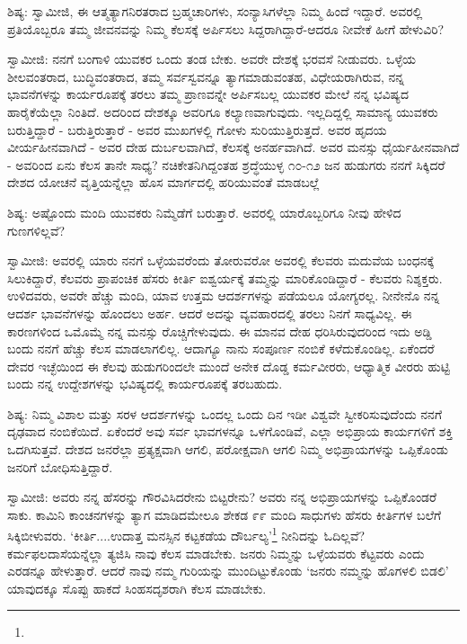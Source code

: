 ಶಿಷ್ಯ: ಸ್ವಾಮೀಜಿ, ಈ ಆತ್ಮತ್ಯಾಗನಿರತರಾದ ಬ್ರಹ್ಮಚಾರಿಗಳು, ಸಂನ್ಯಾಸಿಗಳೆಲ್ಲಾ ನಿಮ್ಮ ಹಿಂದೆ ಇದ್ದಾರೆ. ಅವರಲ್ಲಿ ಪ್ರತಿಯೊಬ್ಬರೂ ತಮ್ಮ ಜೀವನವನ್ನು ನಿಮ್ಮ ಕೆಲಸಕ್ಕೆ ಅರ್ಪಿಸಲು ಸಿದ್ದರಾಗಿದ್ದಾರೆ-ಆದರೂ ನೀವೇಕೆ ಹೀಗೆ ಹೇಳುವಿರಿ?

ಸ್ವಾಮೀಜಿ: ನನಗೆ ಬಂಗಾಳಿ ಯುವಕರ ಒಂದು ತಂಡ ಬೇಕು. ಅವರೇ ದೇಶಕ್ಕೆ ಭರವಸೆ ನೀಡುವರು. ಒಳ್ಳೆಯ ಶೀಲವಂತರಾದ, ಬುದ್ಧಿವಂತರಾದ, ತಮ್ಮ ಸರ್ವಸ್ವವನ್ನೂ ತ್ಯಾಗಮಾಡುವಂತಹ, ವಿಧೇಯರಾಗಿರುವ, ನನ್ನ ಭಾವನೆಗಳನ್ನು ಕಾರ್ಯರೂಪಕ್ಕೆ ತರಲು ತಮ್ಮ ಪ್ರಾಣವನ್ನೇ ಅರ್ಪಿಸಬಲ್ಲ ಯುವಕರ ಮೇಲೆ ನನ್ನ ಭವಿಷ್ಯದ ಹಾರೈಕೆಯೆಲ್ಲಾ ನಿಂತಿದೆ. ಅದರಿಂದ ದೇಶಕ್ಕೂ ಅವರಿಗೂ ಕಲ್ಯಾಣವಾಗುವುದು. ಇಲ್ಲದಿದ್ದಲ್ಲಿ ಸಾಮಾನ್ಯ ಯುವಕರು ಬರುತ್ತಿದ್ದಾರೆ - ಬರುತ್ತಿರುತ್ತಾರೆ - ಅವರ ಮುಖಗಳಲ್ಲಿ ಗೋಳು ಸುರಿಯುತ್ತಿರುತ್ತದೆ. ಅವರ ಹೃದಯ ವೀರ್ಯಹೀನವಾಗಿದೆ - ಅವರ ದೇಹ ದುರ್ಬಲವಾಗಿದೆ, ಕೆಲಸಕ್ಕೆ ಅನರ್ಹವಾಗಿದೆ. ಅವರ ಮನಸ್ಸು ಧೈರ್ಯಹೀನವಾಗಿದೆ - ಅವರಿಂದ ಏನು ಕೆಲಸ ತಾನೇ ಸಾಧ್ಯ? ನಚಿಕೇತನಿಗಿದ್ದಂತಹ ಶ್ರದ್ಧೆಯುಳ್ಳ ೧೦-೧೨ ಜನ ಹುಡುಗರು ನನಗೆ ಸಿಕ್ಕಿದರೆ ದೇಶದ ಯೋಚನೆ ವೃತ್ತಿಯನ್ನೆಲ್ಲಾ ಹೊಸ ಮಾರ್ಗದಲ್ಲಿ ಹರಿಯುವಂತೆ ಮಾಡಬಲ್ಲೆ

ಶಿಷ್ಯ: ಅಷ್ಟೊಂದು ಮಂದಿ ಯುವಕರು ನಿಮ್ಮೆಡೆಗೆ ಬರುತ್ತಾರೆ. ಅವರಲ್ಲಿ ಯಾರೊಬ್ಬರಿಗೂ ನೀವು ಹೇಳಿದ ಗುಣಗಳಿಲ್ಲವೆ?

ಸ್ವಾಮೀಜಿ: ಅವರಲ್ಲಿ ಯಾರು ನನಗೆ ಒಳ್ಳೆಯವರೆಂದು ತೋರುವರೋ ಅವರಲ್ಲಿ ಕೆಲವರು ಮದುವೆಯ ಬಂಧನಕ್ಕೆ ಸಿಲುಕಿದ್ದಾರೆ, ಕೆಲವರು ಪ್ರಾಪಂಚಿಕ ಹೆಸರು ಕೀರ್ತಿ ಐಶ್ವರ್ಯಕ್ಕೆ ತಮ್ಮನ್ನು ಮಾರಿಕೊಂಡಿದ್ದಾರೆ - ಕೆಲವರು ನಿಶ್ಶಕ್ತರು. ಉಳಿದವರು, ಅವರೇ ಹೆಚ್ಚು ಮಂದಿ, ಯಾವ ಉತ್ತಮ ಆದರ್ಶಗಳನ್ನು ಪಡೆಯಲೂ ಯೋಗ್ಯರಲ್ಲ. ನೀನೇನೊ ನನ್ನ ಆದರ್ಶ ಭಾವನೆಗಳನ್ನು ಹೊಂದಲು ಅರ್ಹ. ಆದರೆ ಅದನ್ನು ವ್ಯವಹಾರದಲ್ಲಿ ತರಲು ನಿನಗೆ ಸಾಧ್ಯವಿಲ್ಲ. ಈ ಕಾರಣಗಳಿಂದ ಒಮೊಮ್ಮೆ ನನ್ನ ಮನಸ್ಸು ರೊಚ್ಚಿಗೇಳುವುದು. ಈ ಮಾನವ ದೇಹ ಧರಿಸಿರುವುದರಿಂದ ಇದು ಅಡ್ಡಿ ಬಂದು ನನಗೆ ಹೆಚ್ಚು ಕೆಲಸ ಮಾಡಲಾಗಲಿಲ್ಲ. ಆದಾಗ್ಯೂ ನಾನು ಸಂಪೂರ್ಣ ನಂಬಿಕೆ ಕಳೆದುಕೊಂಡಿಲ್ಲ. ಏಕೆಂದರೆ ದೇವರ ಇಚ್ಛೆಯಿಂದ ಈ ಕೆಲವು ಹುಡುಗರಿಂದಲೇ ಮುಂದೆ ಅನೇಕ ದೊಡ್ಡ ಕರ್ಮವೀರರು, ಆಧ್ಯಾತ್ಮಿಕ ವೀರರು ಹುಟ್ಟಿ ಬಂದು ನನ್ನ ಉದ್ದೇಶಗಳನ್ನು ಭವಿಷ್ಯದಲ್ಲಿ ಕಾರ್ಯರೂಪಕ್ಕೆ ತರಬಹುದು.

ಶಿಷ್ಯ: ನಿಮ್ಮ ವಿಶಾಲ ಮತ್ತು ಸರಳ ಆದರ್ಶಗಳನ್ನು ಒಂದಲ್ಲ ಒಂದು ದಿನ ಇಡೀ ವಿಶ್ವವೇ ಸ್ವೀಕರಿಸುವುದೆಂದು ನನಗೆ ದೃಢವಾದ ನಂಬಿಕೆಯಿದೆ. ಏಕೆಂದರೆ ಅವು ಸರ್ವ ಭಾವಗಳನ್ನೂ ಒಳಗೊಂಡಿವೆ, ಎಲ್ಲಾ ಅಭಿಪ್ರಾಯ ಕಾರ್ಯಗಳಿಗೆ ಶಕ್ತಿ ಒದಗಿಸುತ್ತವೆ. ದೇಶದ ಜನರೆಲ್ಲಾ ಪ್ರತ್ಯಕ್ಷವಾಗಿ ಆಗಲಿ, ಪರೋಕ್ಷವಾಗಿ ಆಗಲಿ ನಿಮ್ಮ ಅಭಿಪ್ರಾಯಗಳನ್ನು ಒಪ್ಪಿಕೊಂಡು ಜನರಿಗೆ ಬೋಧಿಸುತ್ತಿದ್ದಾರೆ.

ಸ್ವಾಮೀಜಿ: ಅವರು ನನ್ನ ಹೆಸರನ್ನು ಗೌರವಿಸಿದರೇನು ಬಿಟ್ಟರೇನು? ಅವರು ನನ್ನ ಅಭಿಪ್ರಾಯಗಳನ್ನು ಒಪ್ಪಿಕೊಂಡರೆ ಸಾಕು. ಕಾಮಿನಿ ಕಾಂಚನಗಳನ್ನು ತ್ಯಾಗ ಮಾಡಿದಮೇಲೂ ಶೇಕಡ ೯೯ ಮಂದಿ ಸಾಧುಗಳು ಹೆಸರು ಕೀರ್ತಿಗಳ ಬಲೆಗೆ ಸಿಕ್ಕಿಬೀಳುವರು. ‘ಕೀರ್ತಿ....ಉದಾತ್ತ ಮನಸ್ಸಿನ ಕಟ್ಟಕಡೆಯ ದೌರ್ಬಲ್ಯ’\footnote{} ನೀನಿದನ್ನು ಓದಿಲ್ಲವೆ? ಕರ್ಮಫಲದಾಸೆಯನ್ನೆಲ್ಲಾ ತ್ಯಜಿಸಿ ನಾವು ಕೆಲಸ ಮಾಡಬೇಕು. ಜನರು ನಿಮ್ಮನ್ನು ಒಳ್ಳೆಯವರು ಕೆಟ್ಟವರು ಎಂದು ಎರಡನ್ನೂ ಹೇಳುತ್ತಾರೆ. ಆದರೆ ನಾವು ನಮ್ಮ ಗುರಿಯನ್ನು ಮುಂದಿಟ್ಟುಕೊಂಡು ‘ಜನರು ನಮ್ಮನ್ನು ಹೊಗಳಲಿ ಬಿಡಲಿ’ ಯಾವುದಕ್ಕೂ ಸೊಪ್ಪು ಹಾಕದೆ ಸಿಂಹಸದೃಶರಾಗಿ ಕೆಲಸ ಮಾಡಬೇಕು.

